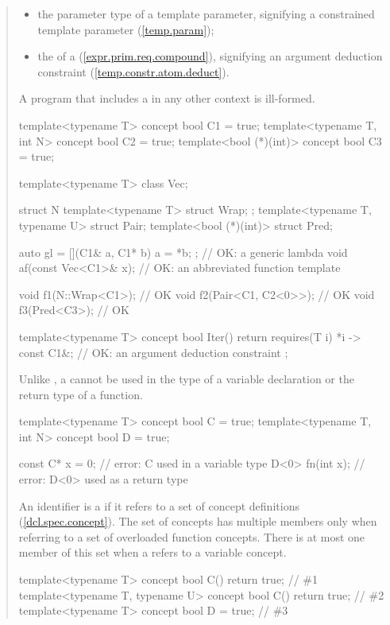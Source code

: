 \begin{quote}
\begin{itemize}
\item the parameter type of a template parameter, signifying a
     constrained template parameter (\ref{temp.param});

\item the  of
     a  (\ref{expr.prim.req.compound}),
     signifying an argument deduction constraint (\ref{temp.constr.atom.deduct}).
\end{itemize}
% 
A program that includes a 
in any other context is ill-formed.
% 
\enterexample
\begin{codeblock}
template<typename T> concept bool C1 = true;
template<typename T, int N> concept bool C2 = true;
template<bool (*)(int)> concept bool C3 = true;

template<typename T> class Vec;

struct N {
  template<typename T> struct Wrap;
};
template<typename T, typename U> struct Pair;
template<bool (*)(int)> struct Pred;

auto gl = [](C1& a, C1* b) { a = *b; }; // OK: a generic lambda
void af(const Vec<C1>& x);              // OK: an abbreviated function template

void f1(N::Wrap<C1>);     // OK
void f2(Pair<C1, C2<0>>); // OK
void f3(Pred<C3>);        // OK

template<typename T> concept bool Iter() {
  return requires(T i) {
    {*i} -> const C1&; // OK: an argument deduction constraint
  };
}
\end{codeblock}
\exitexample

\pnum
\enternote
Unlike , a  cannot
be used in the type of a variable declaration or the return type of
a function.
\enterexample
\begin{codeblock}
template<typename T> concept bool C = true;
template<typename T, int N> concept bool D = true;

const C* x = 0;  // error: C used in a variable type
D<0> fn(int x);  // error: D<0> used as a return type
\end{codeblock}
\exitexample
\exitnote

\pnum
An identifier is a  if it refers to a set of 
concept definitions (\ref{dcl.spec.concept}).
%
\enternote
The set of concepts has multiple members only when referring to a set of 
overloaded function concepts. There is at most one member of this set when a
 refers to a variable concept.
\exitnote
%
\enterexample
\begin{codeblock}
template<typename T> concept bool C() { return true; }             // \#1
template<typename T, typename U> concept bool C() { return true; } // \#2
template<typename T> concept bool D = true;                        // \#3


\end{codeblock}
\end{quote}
